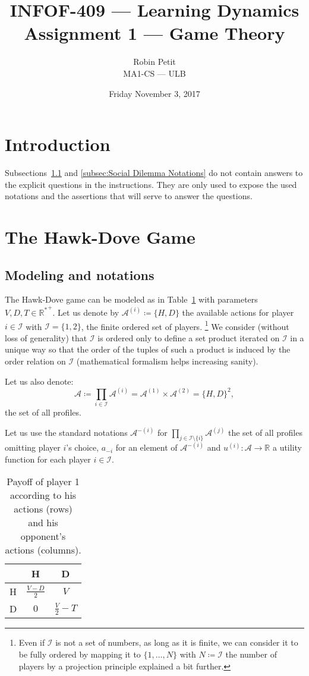 \documentclass{article}
\title{INFOF-409 --- Learning Dynamics\\Assignment 1 --- Game Theory}
\author{Robin Petit \\
MA1-CS --- ULB}
\date{Friday November 3, 2017}
\newcommand{\R}{\mathbb R}
\begin{document}
\maketitle

\section*{Introduction}
Subsections~\ref{subsec:Hawk-Dove Notations} and \ref{subsec:Social Dilemma Notations}
do not contain answers to the explicit questions in the instructions. They are only used to
expose the used notations and the assertions that will serve to answer the questions.

\section{The Hawk-Dove Game}
\subsection{Modeling and notations}\label{subsec:Hawk-Dove Notations}
The Hawk-Dove game can be modeled as in Table~\ref{tab:Hawk-Dove} with parameters $V, D, T \in {\R^*}^+$.
Let us denote by $\mathcal A^{(i)} \coloneqq \{H, D\}$ the available
actions for player $i \in \mathcal I$ with $\mathcal I = \{1, 2\}$, the finite ordered set of players.
\footnote{Even if $\mathcal I$ is not a set of numbers, as long as it is finite, we can consider
it to be fully ordered by mapping it to $\{1, \ldots, N\}$ with $N \coloneqq \mathcal I$ the number
of players by a projection principle explained a bit further.} We consider (without loss of generality)
that $\mathcal I$ is ordered only to define a set product iterated on $\mathcal I$ in a unique
way so that the order of the tuples of such a product is induced by the order relation on $\mathcal I$
(mathematical formalism helps increasing sanity).

Let us also denote:
\[\mathcal A \coloneqq \prod_{i \in \mathcal I}\mathcal A^{(i)} = \mathcal A^{(1)} \times \mathcal A^{(2)} = \{H, D\}^2,\]
the set of all profiles.

Let us use the standard notations $\mathcal A^{-(i)}$ for $\prod_{j \in \mathcal I \setminus \{i\}} \mathcal A^{(j)}$
the set of all profiles omitting player $i$'s choice, $a_{-i}$ for an element of $\mathcal A^{-(i)}$
and $u^{(i)} : \mathcal A \to \R$ a utility function for each player $i \in \mathcal I$.

\begin{table}[!h]
\centering
\begin{tabular}{c||c|c}
& H & D \\ \hline \hline
H & $\frac {V-D}2$ & $V$ \\ \hline
D & $0$ & $\frac V2 - T$
\end{tabular}
\caption{Payoff of player 1 according to his actions (rows) and his opponent's actions (columns).\label{tab:Hawk-Dove}}
\end{table}
\end{document}
